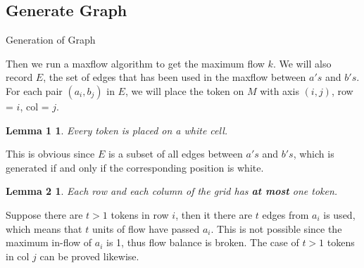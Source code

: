 \documentclass{report}
\begin{document}
    \subsection*{Generate Graph}
    \begin{algorithm}
        \caption{Generation of Graph}
        \begin{algorithmic}[1]
            \EndFor{}
                    \EndIf{}
                \EndFor{}
            \EndFor{}
        \end{algorithmic}
    \end{algorithm}
    Then we run a maxflow algorithm to get the maximum flow $k$. We will also record $E$,
    the set of edges that has been used in the maxflow between $a's$ and $b's$. 
    For each pair $(a_i, b_j)$ in $E$, we will place the token on $M$ with axis $(i, j)$,
    row = $i$, col = $j$. 
    \newtheorem*{l1}{Lemma 1}
    \begin{l1}
        Every token is placed on a white cell.
    \end{l1}
    This is obvious since $E$ is a subset of all edges between $a's$ and $b's$, which 
    is generated if and only if the corresponding position is white.
    \newtheorem*{l2}{Lemma 2}
    \begin{l2}
        Each row and each column of the grid has \textbf{at most} one token.
    \end{l2}
    Suppose there are $t>1$ tokens in row $i$, then it there are $t$ edges from
    $a_i$ is used, which means that $t$ units of flow have passed $a_i$. This is not 
    possible since the maximum in-flow of $a_i$ is 1, thus flow balance is broken.
    The case of $t>1$ tokens in col $j$ can be proved likewise. 
\end{document}
